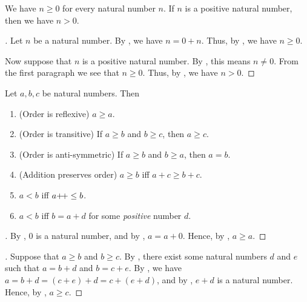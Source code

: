 \begin{ac}\label{i:ac:2.2.4}
  We have \(n \geq 0\) for every natural number \(n\).
  If \(n\) is a positive natural number, then we have \(n > 0\).
\end{ac}

\begin{proof}[]
  Let \(n\) be a natural number.
  By , we have \(n = 0 + n\).
  Thus, by , we have \(n \geq 0\).

  Now suppose that \(n\) is a positive natural number.
  By , this means \(n \neq 0\).
  From the first paragraph we see that \(n \geq 0\).
  Thus, by , we have \(n > 0\).
\end{proof}

\begin{prop}\label{i:2.2.12}
  Let \(a, b, c\) be natural numbers.
  Then
  \begin{enumerate}
    \item\label{i:2.2.12.a} (Order is reflexive) \(a \geq a\).
    \item\label{i:2.2.12.b} (Order is transitive) If \(a \geq b\) and \(b \geq c\), then \(a \geq c\).
    \item\label{i:2.2.12.c} (Order is anti-symmetric) If \(a \geq b\) and \(b \geq a\), then \(a = b\).
    \item\label{i:2.2.12.d} (Addition preserves order) \(a \geq b\) iff \(a + c \geq b + c\).
    \item\label{i:2.2.12.e} \(a < b\) iff \(a{+}\!{+} \leq b\).
    \item\label{i:2.2.12.f} \(a < b\) iff \(b = a + d\) for some \emph{positive} number \(d\).
  \end{enumerate}
\end{prop}

\begin{proof}[]
  By , \(0\) is a natural number, and by , \(a = a + 0\).
  Hence, by , \(a \geq a\).
\end{proof}

\begin{proof}[]
  Suppose that \(a \geq b\) and \(b \geq c\).
  By , there exist some natural numbers \(d\) and \(e\) such that \(a = b + d\) and \(b = c + e\).
  By , we have \(a = b + d = (c + e) + d = c + (e + d)\), and by , \(e + d\) is a natural number.
  Hence, by , \(a \geq c\).
\end{proof}

